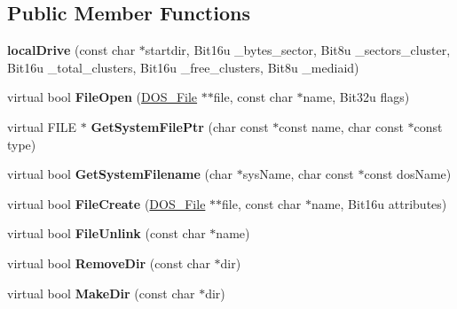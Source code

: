 \subsection*{Public Member Functions}
\begin{DoxyCompactItemize}
\item 
\hypertarget{classlocalDrive_aa68b58d5b5f7783f979bc948c1acf5d6}{{\bfseries local\-Drive} (const char $\ast$startdir, Bit16u \-\_\-bytes\-\_\-sector, Bit8u \-\_\-sectors\-\_\-cluster, Bit16u \-\_\-total\-\_\-clusters, Bit16u \-\_\-free\-\_\-clusters, Bit8u \-\_\-mediaid)}\label{classlocalDrive_aa68b58d5b5f7783f979bc948c1acf5d6}

\item 
\hypertarget{classlocalDrive_ad995ca152b5317564349a83c1b71147c}{virtual bool {\bfseries File\-Open} (\hyperlink{classDOS__File}{D\-O\-S\-\_\-\-File} $\ast$$\ast$file, const char $\ast$name, Bit32u flags)}\label{classlocalDrive_ad995ca152b5317564349a83c1b71147c}

\item 
\hypertarget{classlocalDrive_acc272d364d252ecb9823d4391487aa9a}{virtual F\-I\-L\-E $\ast$ {\bfseries Get\-System\-File\-Ptr} (char const $\ast$const name, char const $\ast$const type)}\label{classlocalDrive_acc272d364d252ecb9823d4391487aa9a}

\item 
\hypertarget{classlocalDrive_adde1e1e3bfcb6fc872b95811afcbd912}{virtual bool {\bfseries Get\-System\-Filename} (char $\ast$sys\-Name, char const $\ast$const dos\-Name)}\label{classlocalDrive_adde1e1e3bfcb6fc872b95811afcbd912}

\item 
\hypertarget{classlocalDrive_aebbef4c6ec78533bb0a5d9fd3d516926}{virtual bool {\bfseries File\-Create} (\hyperlink{classDOS__File}{D\-O\-S\-\_\-\-File} $\ast$$\ast$file, const char $\ast$name, Bit16u attributes)}\label{classlocalDrive_aebbef4c6ec78533bb0a5d9fd3d516926}

\item 
\hypertarget{classlocalDrive_a52db5697876d2dead4bb414f773c78db}{virtual bool {\bfseries File\-Unlink} (const char $\ast$name)}\label{classlocalDrive_a52db5697876d2dead4bb414f773c78db}

\item 
\hypertarget{classlocalDrive_a5cd7f73b33837c8578c0446b9f3af3ba}{virtual bool {\bfseries Remove\-Dir} (const char $\ast$dir)}\label{classlocalDrive_a5cd7f73b33837c8578c0446b9f3af3ba}

\item 
\hypertarget{classlocalDrive_a06d94c67a748bda15000dd9fc86f9e38}{virtual bool {\bfseries Make\-Dir} (const char $\ast$dir)}\label{classlocalDrive_a06d94c67a748bda15000dd9fc86f9e38}


\end{DoxyCompactItemize}
